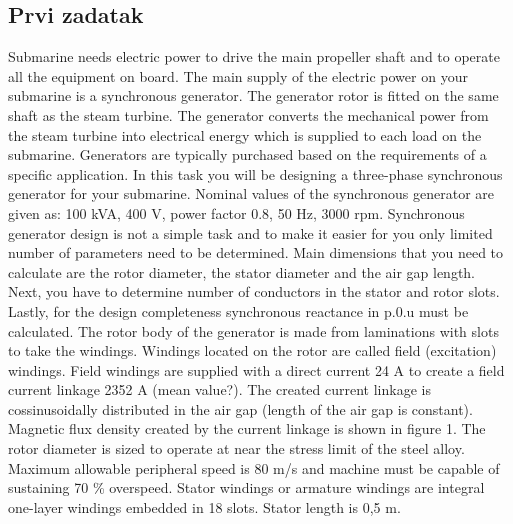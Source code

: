 \documentclass[a4paper]{article}
\begin{document}
\subsection{Prvi zadatak}
Submarine needs electric power to drive the main propeller shaft and to operate all the equipment on board. The main supply of the electric power on your submarine is a synchronous generator. The generator rotor is fitted on the same shaft as the steam turbine. The generator converts the mechanical power from the steam turbine into electrical energy which is supplied to each load on the submarine. Generators are typically purchased based on the requirements of a specific application. In this task you will be designing a three-phase synchronous generator for your submarine. Nominal values of the synchronous generator are given as: 100 kVA, 400 V, power factor 0.8, 50 Hz, 3000 rpm.
Synchronous generator design is not a simple task and to make it easier for you only limited  number of parameters need to be determined. Main dimensions that you need to calculate are the rotor diameter, the stator diameter and the air gap length. Next, you have to determine number of conductors in the stator and rotor slots. Lastly, for the design completeness synchronous reactance in p.0.u must be calculated. 
The rotor body of the generator is made from laminations with slots to take the windings. Windings located on the rotor are called field (excitation) windings. Field windings are supplied with a direct current 24 A to create a field current linkage 2352 A (mean value?). The created current linkage is cossinusoidally distributed in the air gap (length of the air gap is constant). Magnetic flux density created by the current linkage is shown in figure 1. The rotor diameter is sized to operate at near the stress limit of the steel alloy. Maximum allowable peripheral speed is 80 m/s and machine must be capable of sustaining 70 \% overspeed. 
Stator windings or armature windings are integral one-layer windings embedded in 18 slots. Stator length is 0,5 m. 
\end{document}
